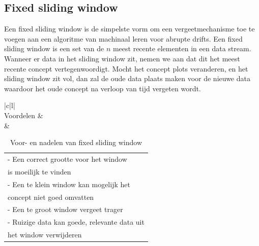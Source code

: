 \subsection{Fixed sliding window}
Een fixed sliding window is de simpelste vorm om een vergeetmechanisme toe te voegen aan een algoritme van machinaal leren voor abrupte drifts. Een fixed sliding window is een set van de $n$ meest recente elementen in een data stream. Wanneer er data in het sliding window zit, nemen we aan dat dit het meest recente concept vertegenwoordigt. Mocht het concept plots veranderen, en het sliding window zit vol, dan zal de oude data plaats maken voor de nieuwe data waardoor het oude concept na verloop van tijd vergeten wordt.
\setcounter{table}{0}
\begin{table}[h]
\begin{tabular}{|c|l|}
\hline
{} \\ \hline
Voordelen &  \\ \hline
{} & \begin{tabular}[c]{@{}l@{}} - Een correct grootte voor het window \\  \phantom{-} is moeilijk te vinden\\ - Een te klein window kan mogelijk het \\ \phantom{-} concept niet goed omvatten\\ - Een te groot window vergeet trager\\ - Ruizige data kan goede, relevante data uit \\ \phantom{-} het window verwijderen\end{tabular} \\ \hline
\end{tabular}
\caption{Voor- en nadelen van fixed sliding window}
\label{tab:voor- en nadelen van fixed sliding window}
\end{table}
